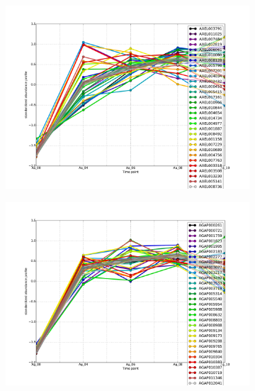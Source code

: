 
\begin{figure}[hp]
% 
\begin{subfigure}[t]{.5\linewidth}
\includegraphics[width=\linewidth]{figures/figs/ecr_and_insects_ptci_20130903/upAfter4_gene_profiles_from_cummerbund/Aa_upAfter4_cls7_Ag_target_FPKMs_vb_orthos.pdf}
\caption{}
\label{fig:cluster7-Aa}
\end{subfigure}%
%
\begin{subfigure}[t]{.5\linewidth}
\includegraphics[width=\linewidth]{figures/figs/ecr_and_insects_ptci_20130903/upAfter4_gene_profiles_from_cummerbund/Ag_upAfter4_cls7_Ag_target_FPKMs_vb_orthos.pdf}
\caption{}
\label{fig:cluster7-Ag}
\end{subfigure}
% 
\begin{subfigure}[t]{.5\linewidth}

\end{subfigure}
\end{figure}
